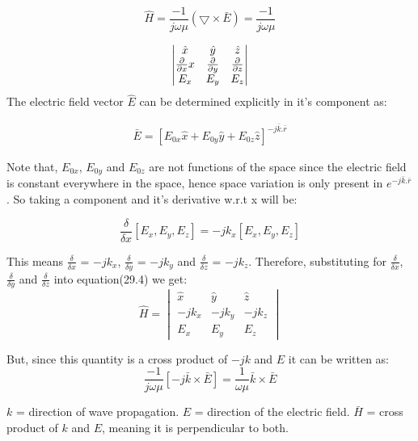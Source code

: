\begin{equation}
\hat{H} = \frac{-1}{j\omega\mu}(\bigtriangledown\times\bar{E}) = 
\frac{-1}{j\omega\mu}
\end{equation}

\[ 
\begin{vmatrix}
$$\hat{x}$$ & $$\hat{y}$$ & $$\hat{z}$$\\
$$\frac{\partial}{\partial x}$$ x & $$\frac{\partial}{\partial y}$$ & $$\frac{\partial}{\partial z}$$\\
$$E_{x}$$ & $$E_{y}$$ & $$E_{z}$$
\end{vmatrix}
\]
\newline
The electric field vector $\hat{E}$ can be determined explicitly in it's component as:

\begin{align}
\bar{E} = [E_{0x}\hat{x} + E_{0y}\hat{y} + E_{0z}\hat{z}]^{-j\bar{k}.\bar{r}}
\end{align}

Note that, $E_{0x}$, $E_{0y}$ and $E_{0z}$ are not functions of the space since the electric field is constant everywhere in the space, hence space variation is only present in $e^{-j\bar{k}.\bar{r}}$.
So taking a component and it's derivative w.r.t x will be:

\begin{equation}
\frac{\delta}{\delta x} [E_x,E_y,E_z] = -jk_x[E_x,E_y,E_z]
\end{equation}

This means $\frac{\delta}{\delta x}$ = $-jk_x$, $\frac{\delta}{\delta y}$ = $-jk_y$ 
and $\frac{\delta}{\delta z}$ = $-jk_z$.
Therefore, substituting for $\frac{\delta}{\delta x}$, $\frac{\delta}{\delta y}$ and $\frac{\delta}{\delta z}$ into equation(29.4) we get:
\begin{equation}
\hat{H} = 
\begin{vmatrix}
\hat{x} & \hat{y} & \hat{z}\\
-jk_x & -jk_y & -jk_z\\
E_{x} & E_{y} & E_{z}
\end{vmatrix}
\end{equation}

But, since this quantity is a cross product of $-jk$ and $E$ it can be written as:
\begin{equation}
\frac{-1}{j\omega\mu} [-j\bar{k}\times\bar{E}] = \frac{1}{\omega\mu} \bar{k}\times\bar{E}
\end{equation}

$k$ = direction of wave propagation.
$E$ = direction of the electric field.
$\bar{H}$ = cross product of $k$ and $E$, meaning it is perpendicular to both.

